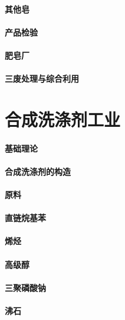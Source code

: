 \documentclass[UTF8]{../../ApplicationUniverse}
\begin{document}
        \subsubsection{其他皂}
    \subsubsection{产品检验}
    \subsubsection{肥皂厂}
    \subsubsection{三废处理与综合利用}








\chapter{合成洗涤剂工业}
\subsubsection{基础理论}
\subsubsection{合成洗涤剂的构造}
\subsubsection{原料}
    \subsubsection{直链烷基苯}
    \subsubsection{烯烃}
    \subsubsection{高级醇}
    \subsubsection{三聚磷酸钠}
    \subsubsection{沸石}
\end{document}
